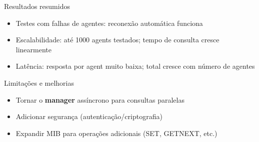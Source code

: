 \documentclass{beamer}
\begin{document}
\begin{frame}{Resultados resumidos}
\begin{itemize}
  \item Testes com falhas de agentes: reconexão automática funciona
  \item Escalabilidade: até 1000 agents testados; tempo de consulta cresce linearmente
  \item Latência: resposta por agent muito baixa; total cresce com número de agentes
\end{itemize}
\end{frame}

\begin{frame}{Limitações e melhorias}
\begin{itemize}
  \item Tornar o \textbf{manager} assíncrono para consultas paralelas
  \item Adicionar segurança (autenticação/criptografia)
  \item Expandir MIB para operações adicionais (SET, GETNEXT, etc.)
\end{itemize}
\end{frame}
\end{document}
